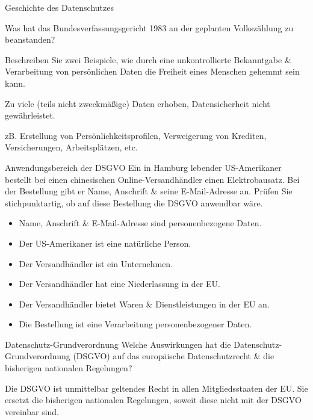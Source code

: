 \documentclass{article}
\author{Leopold Lemmermann}
\begin{document}
\createtitle

\begin{exercises}{Geschichte des Datenschutzes}
\item Was hat das Bundesverfassungsgericht 1983 an der geplanten Volkszählung zu beanstanden?
\item Beschreiben Sie zwei Beispiele, wie durch eine unkontrollierte Bekanntgabe \& Verarbeitung von persönlichen Daten die Freiheit eines Menschen gehemmt sein kann.
\end{exercises}

\begin{solutions}
  \item Zu viele (teils nicht zweckmäßige) Daten erhoben, Datensicherheit nicht gewährleistet.
  \item zB. Erstellung von Persönlichkeitsprofilen, Verweigerung von Krediten, Versicherungen, Arbeitsplätzen, etc.
\end{solutions}

\begin{exercise}{Anwendungsbereich der DSGVO}
  Ein in Hamburg lebender US-Amerikaner bestellt bei einen chinesischen Online-Versandhändler einen Elektrobausatz. Bei der Bestellung gibt er Name, Anschrift \& seine E-Mail-Adresse an. Prüfen Sie stichpunktartig, ob auf diese Bestellung die DSGVO anwendbar wäre.

  \begin{solution}
    \begin{itemize}
      \item Name, Anschrift \& E-Mail-Adresse sind personenbezogene Daten. \checkmark
      \item Der US-Amerikaner ist eine natürliche Person. \checkmark
      \item Der Versandhändler ist ein Unternehmen. \checkmark
      \item Der Versandhändler hat eine Niederlassung in der EU. \xmark
      \item Der Versandhändler bietet Waren \& Dienstleistungen in der EU an. \checkmark
      \item Die Bestellung ist eine Verarbeitung personenbezogener Daten. \checkmark
    \end{itemize}
  \end{solution}
\end{exercise}

\begin{exercise}{Datenschutz-Grundverordnung}
  Welche Auswirkungen hat die Datenschutz-Grundverordnung (DSGVO) auf das europäische Datenschutzrecht \& die bisherigen nationalen Regelungen?

  \begin{solution}
    Die DSGVO ist unmittelbar geltendes Recht in allen Mitgliedsstaaten der EU. Sie ersetzt die bisherigen nationalen Regelungen, soweit diese nicht mit der DSGVO vereinbar sind.
  \end{solution}
\end{exercise}
\end{document}
